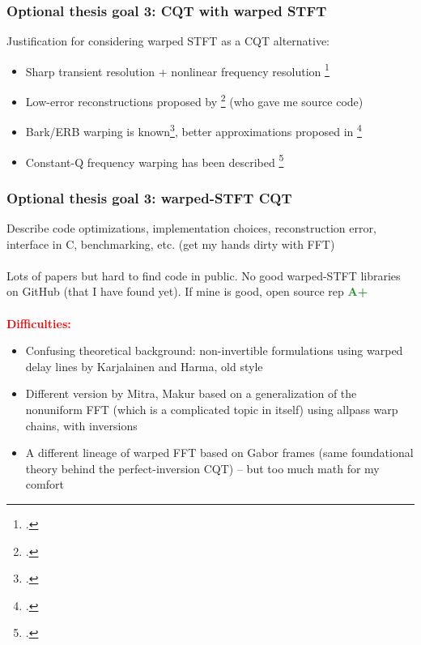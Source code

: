 \documentclass[usenames,dvipsnames]{beamer}
\begin{document}
\begin{frame}
	\frametitle{Optional thesis goal 3: CQT with warped STFT}
	Justification for considering warped STFT as a CQT alternative:
	\begin{itemize}
		\item
			Sharp transient resolution + nonlinear frequency resolution \footcite{warpwabnik}
		\item
			Low-error reconstructions proposed by \footcite{makur2008} (who gave me source code)
		\item
			Bark/ERB warping is known\footcite{barkerb}, better approximations proposed in \footcite{betterwarp}
		\item
			Constant-Q frequency warping has been described \footcite{cqwarp}
	\end{itemize}
\end{frame}

\begin{frame}
	\frametitle{Optional thesis goal 3: warped-STFT CQT}
	Describe code optimizations, implementation choices, reconstruction error, interface in C, benchmarking, etc. (get my hands dirty with FFT)\\\ \\
	Lots of papers but hard to find code in public. No good warped-STFT libraries on GitHub (that I have found yet). If mine is good, open source rep \textcolor{ForestGreen}{\textbf{A+}}\\\ \\
	\textcolor{red}{\textbf{Difficulties:}}
	\begin{itemize}
		\item
			Confusing theoretical background: non-invertible formulations using warped delay lines by Karjalainen and Harma, old style
		\item
			Different version by Mitra, Makur based on a generalization of the nonuniform FFT (which is a complicated topic in itself) using allpass warp chains, with inversions
		\item
			A different lineage of warped FFT based on Gabor frames (same foundational theory behind the perfect-inversion CQT) -- but too much math for my comfort
	\end{itemize}
\end{frame}
\end{document}
